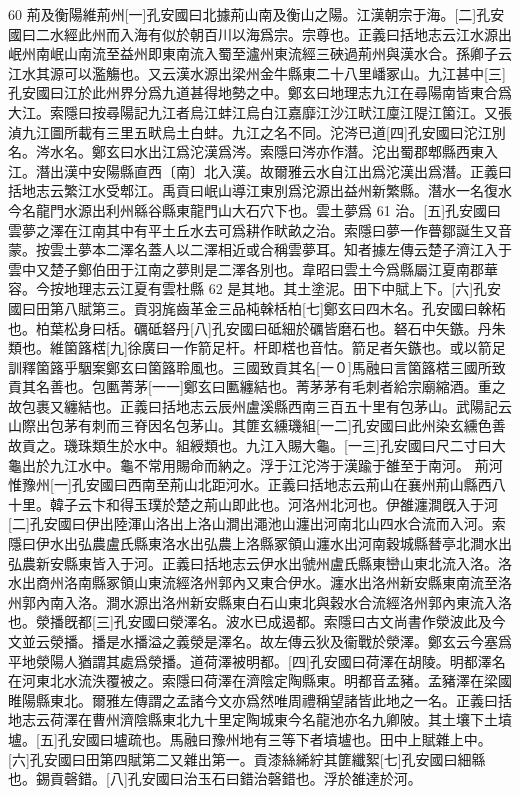 60
荊及衡陽維荊州[一]孔安國曰北據荊山南及衡山之陽。江漢朝宗于海。[二]孔安國曰二水經此州而入海有似於朝百川以海爲宗。宗尊也。正義曰括地志云江水源出岷州南岷山南流至益州即東南流入蜀至瀘州東流經三硤過荊州與漢水合。孫卿子云江水其源可以濫觴也。又云漢水源出梁州金牛縣東二十八里嶓冢山。九江甚中[三]孔安國曰江於此州界分爲九道甚得地勢之中。鄭玄曰地理志九江在尋陽南皆東合爲大江。索隱曰按尋陽記九江者烏江蚌江烏白江嘉靡江沙江畎江廩江隄江箘江。又張湞九江圖所載有三里五畎烏土白蚌。九江之名不同。沱涔已道[四]孔安國曰沱江別名。涔水名。鄭玄曰水出江爲沱漢爲涔。索隱曰涔亦作潛。沱出蜀郡郫縣西東入江。潛出漢中安陽縣直西〔南〕北入漢。故爾雅云水自江出爲沱漢出爲潛。正義曰括地志云繁江水受郫江。禹貢曰岷山導江東別爲沱源出益州新繁縣。潛水一名復水今名龍門水源出利州緜谷縣東龍門山大石穴下也。雲土夢爲
61
治。[五]孔安國曰雲夢之澤在江南其中有平土丘水去可爲耕作畎畝之治。索隱曰夢一作瞢鄒誕生又音蒙。按雲土夢本二澤名蓋人以二澤相近或合稱雲夢耳。知者據左傳云楚子濟江入于雲中又楚子鄭伯田于江南之夢則是二澤各別也。韋昭曰雲土今爲縣屬江夏南郡華容。今按地理志云江夏有雲杜縣
62
是其地。其土塗泥。田下中賦上下。[六]孔安國曰田第八賦第三。貢羽旄齒革金三品杶榦栝柏[七]鄭玄曰四木名。孔安國曰榦柘也。柏葉松身曰栝。礪砥砮丹[八]孔安國曰砥細於礪皆磨石也。砮石中矢鏃。丹朱類也。維箘簬楛[九]徐廣曰一作箭足杆。杆即楛也音怙。箭足者矢鏃也。或以箭足訓釋箘簬乎駰案鄭玄曰箘簬聆風也。三國致貢其名[一０]馬融曰言箘簬楛三國所致貢其名善也。包匭菁茅[一一]鄭玄曰匭纏結也。菁茅茅有毛刺者給宗廟縮酒。重之故包裹又纏結也。正義曰括地志云辰州盧溪縣西南三百五十里有包茅山。武陽記云山際出包茅有刺而三脊因名包茅山。其篚玄纁璣組[一二]孔安國曰此州染玄纁色善故貢之。璣珠類生於水中。組綬類也。九江入賜大龜。[一三]孔安國曰尺二寸曰大龜出於九江水中。龜不常用賜命而納之。浮于江沱涔于漢踰于雒至于南河。
荊河惟豫州[一]孔安國曰西南至荊山北距河水。正義曰括地志云荊山在襄州荊山縣西八十里。韓子云卞和得玉璞於楚之荊山即此也。河洛州北河也。伊雒瀍澗旣入于河[二]孔安國曰伊出陸渾山洛出上洛山澗出澠池山瀍出河南北山四水合流而入河。索隱曰伊水出弘農盧氏縣東洛水出弘農上洛縣冢領山瀍水出河南穀城縣朁亭北澗水出弘農新安縣東皆入于河。正義曰括地志云伊水出虢州盧氏縣東巒山東北流入洛。洛水出商州洛南縣冢領山東流經洛州郭內又東合伊水。瀍水出洛州新安縣東南流至洛州郭內南入洛。澗水源出洛州新安縣東白石山東北與穀水合流經洛州郭內東流入洛也。滎播旣都[三]孔安國曰滎澤名。波水已成遏都。索隱曰古文尚書作滎波此及今文並云滎播。播是水播溢之義滎是澤名。故左傳云狄及衞戰於滎澤。鄭玄云今塞爲平地滎陽人猶謂其處爲滎播。道荷澤被明都。[四]孔安國曰荷澤在胡陵。明都澤名在河東北水流泆覆被之。索隱曰荷澤在濟陰定陶縣東。明都音孟豬。孟豬澤在梁國睢陽縣東北。爾雅左傳謂之孟諸今文亦爲然唯周禮稱望諸皆此地之一名。正義曰括地志云荷澤在曹州濟陰縣東北九十里定陶城東今名龍池亦名九卿陂。其土壤下土墳壚。[五]孔安國曰壚疏也。馬融曰豫州地有三等下者墳壚也。田中上賦雜上中。[六]孔安國曰田第四賦第二又雜出第一。貢漆絲絺紵其篚纖絮[七]孔安國曰細緜也。錫貢磬錯。[八]孔安國曰治玉石曰錯治磬錯也。浮於雒達於河。
